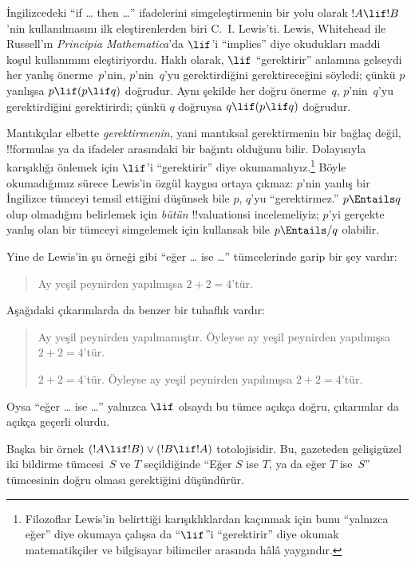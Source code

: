 \documentclass[../../../include/open-logic-section]{subfiles}
\begin{document}


İngilizcedeki ``if \dots{} then \dots'' ifadelerini simgeleştirmenin bir
yolu olarak $!A\lif !B$'nin kullanılmasını ilk eleştirenlerden biri
C.~I. Lewis'ti. Lewis, Whitehead ile Russell'ın \emph{Principia
Mathematica}'da $\lif$'i ``implies'' diye okudukları maddi koşul kullanımını
eleştiriyordu. Haklı olarak, $\lif$ ``gerektirir'' anlamına gelseydi her
yanlış önerme~$p$'nin, $p$'nin~$q$'yu gerektirdiğini gerektireceğini söyledi;
çünkü $p$ yanlışsa $p\lif(p\lif q)$ doğrudur. Aynı şekilde her doğru
önerme~$q$, $p$'nin~$q$'yu gerektirdiğini gerektirirdi; çünkü $q$ doğruysa
$q\lif(p\lif q)$ doğrudur.

Mantıkçılar elbette \emph{gerektirmenin}, yani mantıksal gerektirmenin bir
bağlaç değil, !!{formula}s ya da ifadeler arasındaki bir bağıntı olduğunu
bilir. Dolayısıyla karışıklığı önlemek için $\lif$'i ``gerektirir'' diye
okumamalıyız.\footnote{Filozoflar Lewis'in belirttiği karışıklıklardan
  kaçınmak için bunu ``yalnızca eğer'' diye okumaya çalışsa da ``$\lif$''i
  ``gerektirir'' diye okumak matematikçiler ve bilgisayar bilimciler arasında
  hâlâ yaygındır.} Böyle okumadığımız sürece Lewis'in özgül kaygısı ortaya
çıkmaz: $p$'nin yanlış bir İngilizce tümceyi temsil ettiğini düşünsek bile
$p$, $q$'yu ``gerektirmez.'' $p\Entails q$ olup olmadığını belirlemek için
\emph{bütün} !!{valuation}s{}i incelemeliyiz; $p$'yi gerçekte yanlış olan bir
tümceyi simgelemek için kullansak bile $p\Entails/ q$ olabilir.

Yine de Lewis'in şu örneği gibi ``eğer \dots{} ise \dots'' tümcelerinde
garip bir şey vardır:
\begin{quote}
Ay yeşil peynirden yapılmışsa $2+2=4$'tür.
\end{quote}
Aşağıdaki çıkarımlarda da benzer bir tuhaflık vardır:
\begin{quote}
  Ay yeşil peynirden yapılmamıştır. Öyleyse ay yeşil peynirden yapılmışsa
  $2+2=4$'tür.

  $2+2=4$'tür. Öyleyse ay yeşil peynirden yapılmışsa $2+2=4$'tür.
\end{quote}
Oysa ``eğer \dots{} ise \dots'' yalnızca $\lif$ olsaydı bu tümce açıkça
doğru, çıkarımlar da açıkça geçerli olurdu.

Başka bir örnek $(!A\lif !B)\lor(!B\lif !A)$ totolojisidir. Bu, gazeteden
gelişigüzel iki bildirme tümcesi~$S$ ve $T$ seçildiğinde ``Eğer $S$ ise $T$,
ya da eğer $T$ ise~$S$'' tümcesinin doğru olması gerektiğini düşündürür.
\end{document}
